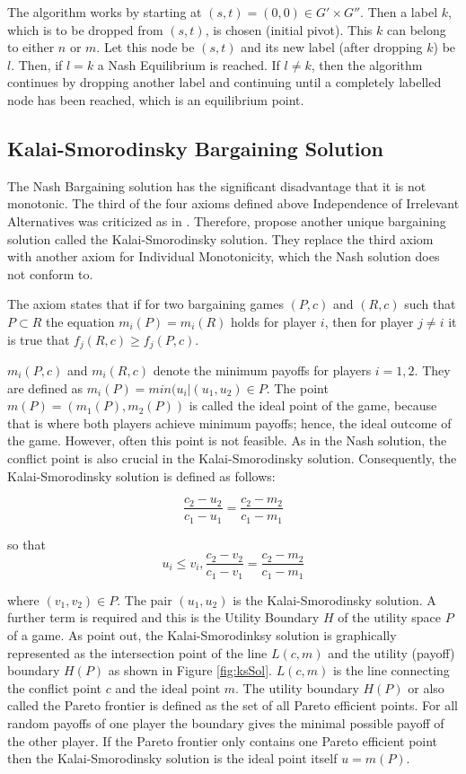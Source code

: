 {The algorithm works by starting at $(s,t) = (0,0) \in G' \times G'' $. Then a label $k$, which is to be dropped from $(s,t)$, is chosen (initial pivot). This $k$ can belong to either $n$ or $m$. Let this node be $(s,t)$ and its new label (after dropping $k$) be $l$. Then, if $l=k$ a Nash Equilibrium is reached. If $l\neq k$, then the algorithm continues by dropping another label and continuing until a completely labelled node has been reached, which is an equilibrium point.

\subsection{Kalai-Smorodinsky Bargaining Solution}
The Nash Bargaining solution has the significant disadvantage that it is not monotonic. The third of the four axioms defined above Independence of Irrelevant Alternatives was criticized as in \citet{kalai1975other}. Therefore, \citet{kalai1975other} propose another unique bargaining solution called the Kalai-Smorodinsky solution. They replace the third axiom with another axiom for Individual Monotonicity, which the Nash solution does not conform to. 

The axiom states that if for two bargaining games $(P,c)$ and $(R,c)$ such that $P \subset R$ the equation $m_i(P) = m_i(R)$ holds for player $i$, then for player $j \neq i$ it is true that $f_j(R,c) \geq f_j(P,c)$.

$m_i(P,c)$ and $m_i(R,c)$ denote the minimum payoffs for players $i = 1,2$. They are defined as $m_i(P) = min(u_i | (u_1,u_2) \in P$. The point $m(P) = (m_1(P),m_2(P))$ is called the ideal point of the game, because that is where both players achieve minimum payoffs; hence, the ideal outcome of the game. However, often this point is not feasible. As in the Nash solution, the conflict point is also crucial in the Kalai-Smorodinsky solution. Consequently, the Kalai-Smorodinsky solution is defined as follows:

\begin{equation}
\label{eq:kalaismorodinsky}
\frac{c_2 - u_2}{c_1 - u_1} = \frac{c_2 - m_2}{c_1 - m_1}
\end{equation}

so that
\begin{equation}
u_i \leq v_i, \frac{c_2 - v_2}{c_1 - v_1} = \frac{c_2 - m_2}{c_1 - m_1} 
\end{equation}

where $(v_1,v_2) \in P$. The pair $(u_1,u_2)$ is the Kalai-Smorodinsky solution. A further term is required and this is the Utility Boundary $H$ of the utility space $P$ of a game. As \citet{kalai1975other} point out, the Kalai-Smorodinksy solution is graphically represented as the intersection point of the line $L(c,m)$ and the utility (payoff) boundary $H(P)$ as shown in Figure \ref{fig:ksSol}. $L(c,m)$ is the line connecting the conflict point $c$ and the ideal point $m$. The utility boundary $H(P)$ or also called the Pareto frontier is defined as the set of all Pareto efficient points. For all random payoffs of one player the boundary gives the minimal possible payoff of the other player. If the Pareto frontier only contains one Pareto efficient point then the Kalai-Smorodinsky solution is the ideal point itself $u = m(P)$.

}
